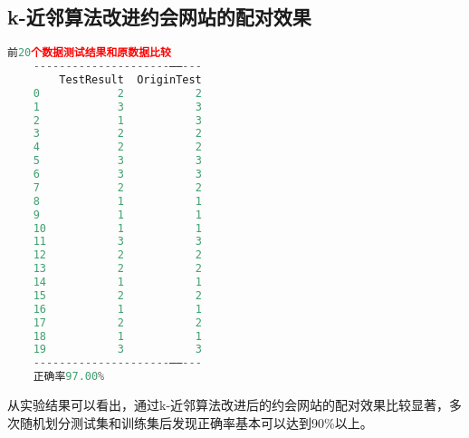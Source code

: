 \documentclass{../source/Experiment}
\begin{document}
\subsection{k-近邻算法改进约会网站的配对效果}
\begin{lstlisting}[language=Python]
    前20个数据测试结果和原数据比较
    ---------------------——---
        TestResult  OriginTest
    0            2           2
    1            3           3
    2            1           3
    3            2           2
    4            2           2
    5            3           3
    6            3           3
    7            2           2
    8            1           1
    9            1           1
    10           1           1
    11           3           3
    12           2           2
    13           2           2
    14           1           1
    15           2           2
    16           1           1
    17           2           2
    18           1           1
    19           3           3
    ---------------------——---
    正确率97.00%
    \end{lstlisting}

从实验结果可以看出，通过k-近邻算法改进后的约会网站的配对效果比较显著，多次随机划分测试集和训练集后发现正确率基本可以达到90\%以上。
\end{document}
